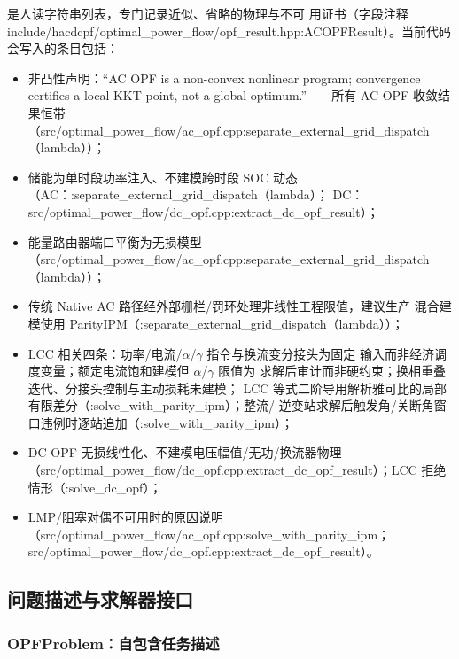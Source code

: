  是人读字符串列表，专门记录近似、省略的物理与不可
用证书（字段注释 include/hacdcpf/optimal\_power\_flow/opf\_result.hpp:ACOPFResult）。当前代码会写入的条目包括：

\begin{itemize}
  \item 非凸性声明：``AC OPF is a non-convex nonlinear program; convergence
        certifies a local KKT point, not a global optimum.''——所有 AC OPF
        收敛结果恒带（src/optimal\_power\_flow/ac\_opf.cpp:separate\_external\_grid\_dispatch（lambda））；
  \item 储能为单时段功率注入、不建模跨时段 SOC 动态（AC：:separate\_external\_grid\_dispatch（lambda）；
        DC：src/optimal\_power\_flow/dc\_opf.cpp:extract\_dc\_opf\_result）；
  \item 能量路由器端口平衡为无损模型（src/optimal\_power\_flow/ac\_opf.cpp:separate\_external\_grid\_dispatch（lambda））；
  \item 传统 Native AC 路径经外部栅栏/罚环处理非线性工程限值，建议生产
        混合建模使用 ParityIPM（:separate\_external\_grid\_dispatch（lambda））；
  \item LCC 相关四条：功率/电流/$\alpha$/$\gamma$ 指令与换流变分接头为固定
        输入而非经济调度变量；额定电流饱和建模但 $\alpha$/$\gamma$ 限值为
        求解后审计而非硬约束；换相重叠迭代、分接头控制与主动损耗未建模；
        LCC 等式二阶导用解析雅可比的局部有限差分（:solve\_with\_parity\_ipm）；整流/
        逆变站求解后触发角/关断角窗口违例时逐站追加（:solve\_with\_parity\_ipm）；
  \item DC OPF 无损线性化、不建模电压幅值/无功/换流器物理
        （src/optimal\_power\_flow/dc\_opf.cpp:extract\_dc\_opf\_result）；LCC 拒绝情形（:solve\_dc\_opf）；
  \item LMP/阻塞对偶不可用时的原因说明（src/optimal\_power\_flow/ac\_opf.cpp:solve\_with\_parity\_ipm；src/optimal\_power\_flow/dc\_opf.cpp:extract\_dc\_opf\_result）。
\end{itemize}

\subsection{问题描述与求解器接口}\label{subsec:overview-interface}

\subsubsection*{OPFProblem：自包含任务描述}

